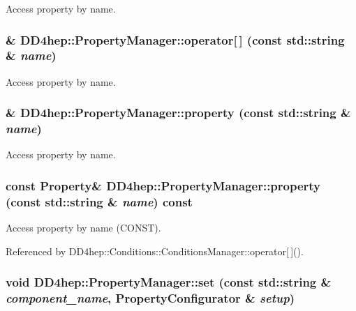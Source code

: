 Access property by name. \hypertarget{class_d_d4hep_1_1_property_manager_a808cecf05d76d3af17553e227130255e}{
\subsubsection[{operator[]}]{\& DD4hep::PropertyManager::operator\mbox{[}$\,$\mbox{]} (const std::string \& {\em name})}}
\label{class_d_d4hep_1_1_property_manager_a808cecf05d76d3af17553e227130255e}


Access property by name. \hypertarget{class_d_d4hep_1_1_property_manager_a801b559283e0815c2172ec832bb3adff}{
\subsubsection[{property}]{\& DD4hep::PropertyManager::property (const std::string \& {\em name})}}
\label{class_d_d4hep_1_1_property_manager_a801b559283e0815c2172ec832bb3adff}


Access property by name. \hypertarget{class_d_d4hep_1_1_property_manager_a03ee7ad7c55e62d4185863d9cad797ac}{
\subsubsection[{property}]{\setlength{\rightskip}{0pt plus 5cm}const {\bf Property}\& DD4hep::PropertyManager::property (const std::string \& {\em name}) const}}
\label{class_d_d4hep_1_1_property_manager_a03ee7ad7c55e62d4185863d9cad797ac}


Access property by name (CONST). 

Referenced by DD4hep::Conditions::ConditionsManager::operator\mbox{[}$\,$\mbox{]}().\hypertarget{class_d_d4hep_1_1_property_manager_a96ebaf0f57064e8fa2f00a42c360ddf8}{
\subsubsection[{set}]{\setlength{\rightskip}{0pt plus 5cm}void DD4hep::PropertyManager::set (const std::string \& {\em component\_\-name}, \/  {\bf PropertyConfigurator} \& {\em setup})}}
\label{class_d_d4hep_1_1_property_manager_a96ebaf0f57064e8fa2f00a42c360ddf8}


